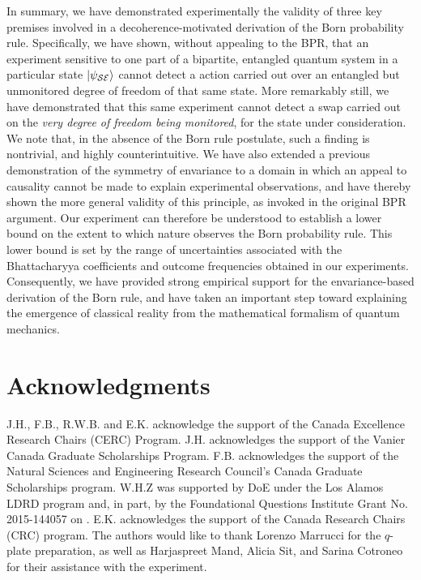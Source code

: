 \documentclass[12pt]{iopart}
\begin{document}
In summary, we have demonstrated experimentally the validity of three key premises involved in a decoherence-motivated derivation of the Born probability rule. Specifically, we have shown, without appealing to the BPR, that an experiment sensitive to one part of a bipartite, entangled quantum system in a particular state $|\psi_{\cal SE}\rangle$ cannot detect a  action carried out over an entangled but unmonitored degree of freedom of that same state. More remarkably still, we have demonstrated that this same experiment cannot detect a swap carried out on the \textit{very degree of freedom being monitored}, for the state under consideration. We note that, in the absence of the Born rule postulate, such a finding is nontrivial, and highly counterintuitive. We have also extended a previous demonstration of the symmetry of envariance to a domain in which an appeal to causality cannot be made to explain experimental observations, and have thereby shown the more general validity of this principle, as invoked in the original BPR argument. {Our experiment can therefore be understood to establish a lower bound on the extent to which nature observes the Born probability rule. This lower bound is set by the range of uncertainties associated with the Bhattacharyya coefficients and outcome frequencies obtained in our experiments. Consequently, we have provided strong empirical support for the envariance-based derivation of the Born rule, and have taken an important step toward explaining the emergence of classical reality from the mathematical formalism of quantum mechanics.}

\section{Acknowledgments}
J.H., F.B., R.W.B. and E.K. acknowledge the support of the Canada Excellence Research Chairs (CERC) Program. J.H. acknowledges the support of the Vanier Canada Graduate Scholarships Program. F.B. acknowledges the support of the Natural Sciences and Engineering Research Council's Canada Graduate Scholarships program. W.H.Z was supported by DoE under the Los Alamos LDRD program and, in part, by the Foundational Questions Institute Grant No. 2015-144057 on . E.K. acknowledges the support of the Canada Research Chairs (CRC) program. The authors would like to thank Lorenzo Marrucci for the $q$-plate preparation, as well as Harjaspreet Mand, Alicia Sit, and Sarina Cotroneo for their assistance with the experiment.
\end{document}
